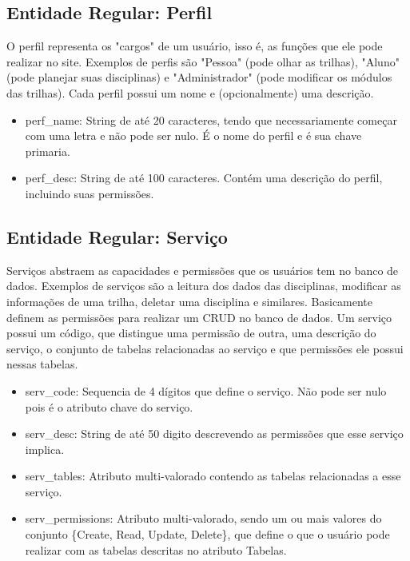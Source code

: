 \documentclass{article}
\begin{document}
  	\subsection{Entidade Regular: Perfil}
  	    \quad O perfil representa os "cargos" de um usuário, isso é, as funções que ele pode realizar no site. Exemplos de perfis são "Pessoa" (pode olhar as trilhas), "Aluno" (pode planejar suas disciplinas) e "Administrador" (pode modificar os módulos das trilhas).
  	    \null \quad Cada perfil possui um nome e (opcionalmente) uma descrição.
  	    \begin{itemize}
  	            \item perf\_name: String de até 20 caracteres, tendo que necessariamente começar com uma letra e não pode ser nulo. É o nome do perfil e é sua chave primaria. 
  	            \item perf\_desc: String de até 100 caracteres. Contém uma descrição do perfil, incluindo suas permissões.
  	    \end{itemize}
  	
  	\subsection{Entidade Regular: Serviço}
  	    \quad Serviços abstraem as capacidades e permissões que os usuários tem no banco de dados. Exemplos de serviços são a leitura dos dados das disciplinas, modificar as informações de uma trilha, deletar uma disciplina e similares. Basicamente definem as permissões para realizar um CRUD no banco de dados.
  	    \null \quad Um serviço possui um código, que distingue uma permissão de outra, uma descrição do serviço, o conjunto de tabelas relacionadas ao serviço e que permissões ele possui nessas tabelas.
  	    \begin{itemize}
  	        \item serv\_code: Sequencia de 4 dígitos que define o serviço. Não pode ser nulo pois é o atributo chave do serviço.
  	        \item serv\_desc: String de até 50 digito descrevendo as permissões que esse serviço implica.
  	        \item serv\_tables: Atributo multi-valorado contendo as tabelas relacionadas a esse serviço.
  	        \item serv\_permissions: Atributo multi-valorado, sendo um ou mais valores do conjunto \{Create, Read, Update, Delete\}, que define o que o usuário pode realizar com as tabelas descritas no atributo Tabelas.
  	    \end{itemize}
  		    
\end{document}
